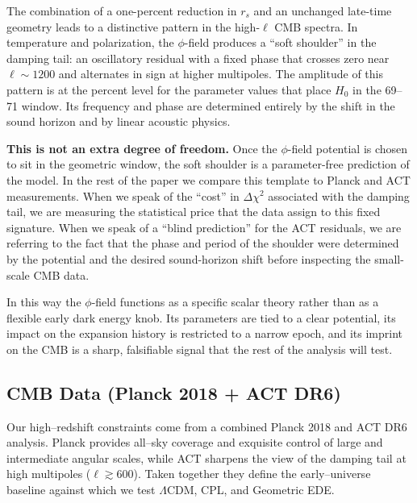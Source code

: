 \documentclass[a4paper,11pt]{article}
\begin{document}
The combination of a one-percent reduction in $r_{s}$ and an unchanged late-time geometry leads to a distinctive pattern in the high-$\ell$ CMB spectra. In temperature and polarization, the $\phi$-field produces a ``soft shoulder'' in the damping tail: an oscillatory residual with a fixed phase that crosses zero near $\ell \sim 1200$ and alternates in sign at higher multipoles. The amplitude of this pattern is at the percent level for the parameter values that place $H_{0}$ in the 69--71 window. Its frequency and phase are determined entirely by the shift in the sound horizon and by linear acoustic physics.

\textbf{This is not an extra degree of freedom.} Once the $\phi$-field potential is chosen to sit in the geometric window, the soft shoulder is a parameter-free prediction of the model. In the rest of the paper we compare this template to Planck and ACT measurements. When we speak of the ``cost'' in $\Delta\chi^{2}$ associated with the damping tail, we are measuring the statistical price that the data assign to this fixed signature. When we speak of a ``blind prediction'' for the ACT residuals, we are referring to the fact that the phase and period of the shoulder were determined by the potential and the desired sound-horizon shift before inspecting the small-scale CMB data.

In this way the $\phi$-field functions as a specific scalar theory rather than as a flexible early dark energy knob. Its parameters are tied to a clear potential, its impact on the expansion history is restricted to a narrow epoch, and its imprint on the CMB is a sharp, falsifiable signal that the rest of the analysis will test.


\subsection{CMB Data (Planck 2018 + ACT DR6)}
\label{sec:cmb_data}

Our high--redshift constraints come from a combined Planck 2018 and ACT DR6 analysis. Planck provides all--sky coverage and exquisite control of large and intermediate angular scales, while ACT sharpens the view of the damping tail at high multipoles ($\ell \gtrsim 600$). Taken together they define the early--universe baseline against which we test $\Lambda$CDM, CPL, and Geometric EDE.
\end{document}
